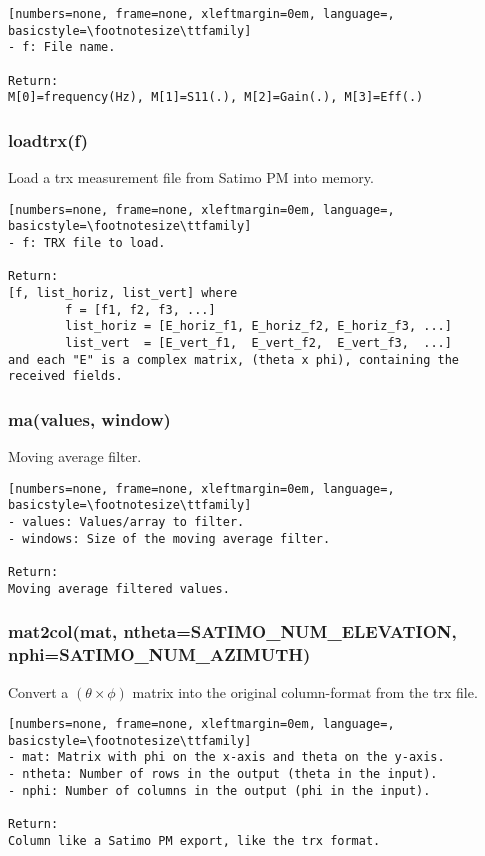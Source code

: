 \begin{lstlisting}[numbers=none, frame=none, xleftmargin=0em, language=, basicstyle=\footnotesize\ttfamily]
- f: File name.

Return:
M[0]=frequency(Hz), M[1]=S11(.), M[2]=Gain(.), M[3]=Eff(.)
\end{lstlisting}

\subsubsection{loadtrx(f)}
Load a trx measurement file from Satimo PM into memory. 

\begin{lstlisting}[numbers=none, frame=none, xleftmargin=0em, language=, basicstyle=\footnotesize\ttfamily]
- f: TRX file to load.

Return:
[f, list_horiz, list_vert] where
        f = [f1, f2, f3, ...]
        list_horiz = [E_horiz_f1, E_horiz_f2, E_horiz_f3, ...]
        list_vert  = [E_vert_f1,  E_vert_f2,  E_vert_f3,  ...]
and each "E" is a complex matrix, (theta x phi), containing the received fields.
\end{lstlisting}

\subsubsection{ma(values, window)}
Moving average filter.

\begin{lstlisting}[numbers=none, frame=none, xleftmargin=0em, language=, basicstyle=\footnotesize\ttfamily]
- values: Values/array to filter.
- windows: Size of the moving average filter.

Return:
Moving average filtered values.
\end{lstlisting}

\subsubsection{mat2col(mat, ntheta=SATIMO\_NUM\_ELEVATION, nphi=SATIMO\_NUM\_AZIMUTH)}
Convert a $(\theta \times \phi)$ matrix into the original column-format from
the trx file.

\begin{lstlisting}[numbers=none, frame=none, xleftmargin=0em, language=, basicstyle=\footnotesize\ttfamily]
- mat: Matrix with phi on the x-axis and theta on the y-axis.
- ntheta: Number of rows in the output (theta in the input).
- nphi: Number of columns in the output (phi in the input).

Return:
Column like a Satimo PM export, like the trx format.
\end{lstlisting}

